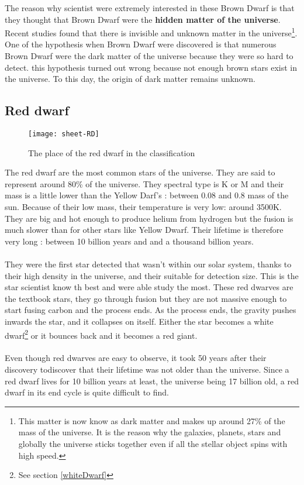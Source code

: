 \documentclass[a4paper, 11pt]{article} %
\begin{document}
The reason why scientist were extremely interested in these Brown Dwarf is that they thought that Brown Dwarf were the \textbf{hidden matter of the universe}. Recent studies found that there is invisible and unknown matter in the universe\footnote{ This matter is now know as dark matter and makes up around 27\% of the mass of the universe. It is the reason why the galaxies, planets, stars and globally the universe sticks together even if all the stellar object spins with high speed.}. One of the hypothesis when Brown Dwarf were discovered is that numerous Brown Dwarf were the dark matter of the universe because they were so hard to detect. this hypothesis turned out wrong because not enough brown stars exist in the universe. To this day, the origin of dark matter remains unknown.

\subsection{Red dwarf}
\newpage
\begin{figure}[h]
\centering
\texttt{[image: sheet-RD]}
\caption{The place of the red dwarf in the classification }
\end{figure}

The red dwarf are the most common stars of the universe. They are said to represent around 80\% of the universe. They spectral type is K or M and their mass is a little lower than the Yellow Darf’s : between 0.08 and 0.8 mass of the sun. Because of their low mass, their temperature is very low: around 3500K. They are big and hot enough to produce helium from hydrogen but the fusion is much slower than for other stars like Yellow Dwarf. Their lifetime is therefore very long : between 10 billion years and  and a thousand billion years. 
\paragraph*{}
They were the first star detected that wasn't within our solar system, thanks to their high density in the universe, and their suitable for detection size. This is the star scientist know th best and were able study the most. These red dwarves are the textbook stars, they go through fusion but they are not massive enough to start fusing carbon and the process ends. As the process ends, the gravity pushes inwards the star, and it collapses on itself. Either the star becomes a white dwarf\footnote{See section \ref{whiteDwarf}} or it bounces back and it becomes a red giant. 
\paragraph*{}
Even though red dwarves are easy to observe, it took 50 years after their discovery todiscover that their lifetime was not older than the universe. Since a red dwarf lives for 10 billion years at least, the universe being 17 billion old, a red dwarf in its end cycle is quite difficult to find.
\newpage
\end{document}
